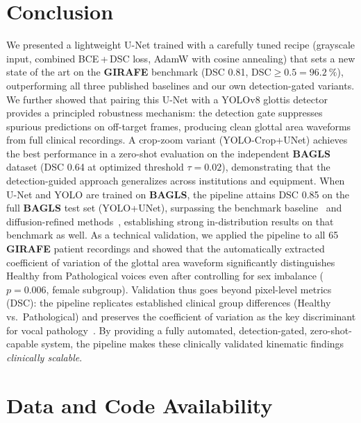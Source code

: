 \documentclass[preprint,12pt]{elsarticle}
\newcommand{\girafe}{\textbf{GIRAFE}}
\newcommand{\bagls}{\textbf{BAGLS}}
\newcommand{\yolounet}{YOLO+UNet}
\newcommand{\yolocrop}{YOLO-Crop+UNet}
\begin{document}
\section{Conclusion}
\label{sec:conclusion}

We presented a lightweight U-Net trained with a carefully tuned recipe
(grayscale input, combined BCE\,+\,DSC loss, AdamW with cosine annealing)
that sets a new state of the art on the \girafe{} benchmark
(DSC \num{0.81}, DSC${\geq}0.5 = \SI{96.2}{\%}$), outperforming all
three published baselines and our own detection-gated variants.
We further showed that pairing this U-Net with a YOLOv8 glottis detector
provides a principled robustness mechanism: the detection gate suppresses
spurious predictions on off-target frames, producing clean glottal area
waveforms from full clinical recordings.
A crop-zoom variant (\yolocrop{}) achieves the best performance in a zero-shot
evaluation on the independent \bagls{} dataset (DSC \num{0.64} at
optimized threshold $\tau{=}0.02$), demonstrating that the detection-guided
approach generalizes across institutions and equipment.
When U-Net and YOLO are trained on \bagls{}, the pipeline attains DSC \num{0.85} on the full \bagls{} test set (\yolounet{}), surpassing the benchmark baseline~\cite{gomez2020bagls} and diffusion-refined methods~\cite{wu2024medsegdiff}, establishing strong in-distribution results on that benchmark as well.
As a technical validation, we applied the pipeline to all \num{65}
\girafe{} patient recordings and showed that the automatically extracted
coefficient of variation of the glottal area waveform significantly
distinguishes Healthy from Pathological voices even after controlling for
sex imbalance ($p{=}0.006$, female subgroup).
Validation thus goes beyond pixel-level metrics (DSC): the pipeline
replicates established clinical group differences (Healthy vs.\
Pathological) and preserves the coefficient of variation as the key
discriminant for vocal pathology~\cite{patel2015kinematic,patel2016nodules}.
By providing a fully automated, detection-gated, zero-shot-capable system,
the pipeline makes these clinically validated kinematic findings
\emph{clinically scalable}.

\section*{Data and Code Availability}
\end{document}
